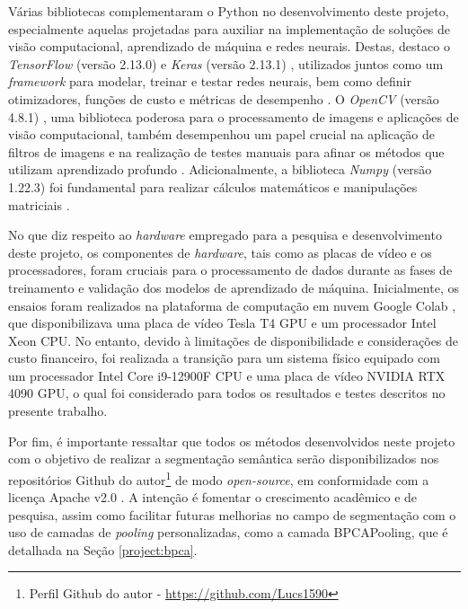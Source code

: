 Várias bibliotecas complementaram o Python no desenvolvimento deste projeto, especialmente aquelas projetadas para auxiliar na implementação de soluções de visão computacional, aprendizado de máquina e redes neurais. Destas, destaco o \textit{TensorFlow} (versão 2.13.0) \citep{MartinAbadi2015Systems} e \textit{Keras} (versão 2.13.1) \citep{Chollet2015Keras}, utilizados juntos como um \textit{framework} para modelar, treinar e testar redes neurais, bem como definir otimizadores, funções de custo e métricas de desempenho \citep{Geron2017Hands-onSystems, Chollet2021DeepPython}. O \textit{OpenCV} (versão 4.8.1) \citep{Bradski2000TheLibrary.}, uma biblioteca poderosa para o processamento de imagens e aplicações de visão computacional, também desempenhou um papel crucial na aplicação de filtros de imagens e na realização de testes manuais para afinar os métodos que utilizam aprendizado profundo \citep{Bradski2000TheLibrary.}. Adicionalmente, a biblioteca \textit{Numpy} (versão 1.22.3) \citep{Harris2020ArrayNumPy} foi fundamental para realizar cálculos matemáticos e manipulações matriciais \citep{Oliphant2007PythonComputing, VanDerWalt2011TheComputation}.

No que diz respeito ao \textit{hardware} empregado para a pesquisa e desenvolvimento deste projeto, os componentes de \textit{hardware}, tais como as placas de vídeo e os processadores, foram cruciais para o processamento de dados durante as fases de treinamento e validação dos modelos de aprendizado de máquina. Inicialmente, os ensaios foram realizados na plataforma de computação em nuvem Google Colab \citep{Bisong2019GoogleColaboratory}, que disponibilizava uma placa de vídeo Tesla T4 GPU e um processador Intel Xeon CPU. No entanto, devido à limitações de disponibilidade e considerações de custo financeiro, foi realizada a transição para um sistema físico equipado com um processador Intel Core i9-12900F CPU e uma placa de vídeo NVIDIA RTX 4090 GPU, o qual foi considerado para todos os resultados e testes descritos no presente trabalho.

Por fim, é importante ressaltar que todos os métodos desenvolvidos neste projeto com o objetivo de realizar a segmentação semântica serão disponibilizados nos repositórios Github do autor\footnote{Perfil Github do autor - \url{https://github.com/Lucs1590}} de modo \textit{open-source}, em conformidade com a licença Apache v2.0 \citep{Licenses}. A intenção é fomentar o crescimento acadêmico e de pesquisa, assim como facilitar futuras melhorias no campo de segmentação com o uso de camadas de \textit{pooling} personalizadas, como a camada BPCAPooling, que é detalhada na Seção \ref{project:bpca}.


